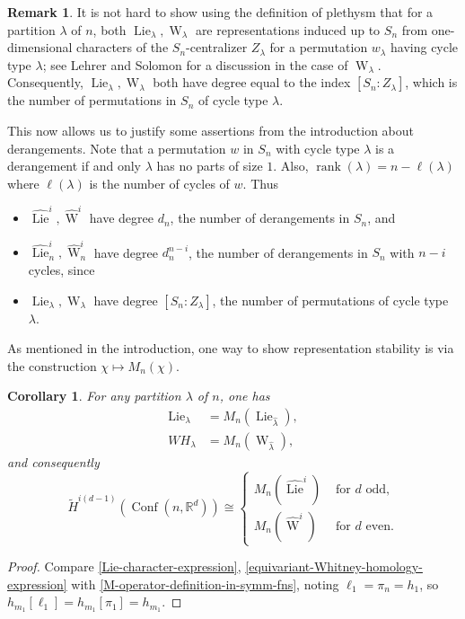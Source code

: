 \documentclass[12pt]{amsart}
\theoremstyle{plain}
\newtheorem{cor}[thm]{Corollary}
\theoremstyle{definition}
\newtheorem{remark}[thm]{Remark}
\begin{document}
\begin{remark}
\label{derangement-remark}
It is not hard to show using the definition of plethysm that
for a partition $\lambda$ of $n$, both 
${{\operatorname{Lie}}}_\lambda, {{\operatorname{W}}}_\lambda$ are representations induced up to $S_n$
from one-dimensional characters of the $S_n$-centralizer 
$Z_\lambda$ for a permutation $w_\lambda$ having cycle type $\lambda$;
see Lehrer and Solomon \cite{LehrerSolomon} for a discussion in the
case of ${{\operatorname{W}}}_\lambda$.  Consequently, ${{\operatorname{Lie}}}_\lambda, {{\operatorname{W}}}_\lambda$ both 
have degree equal to the index $[S_n:Z_\lambda]$,
which is the number of permutations in $S_n$ of cycle type $\lambda$.

This now allows us to justify some assertions from the introduction about
derangements.  Note that a permutation $w$ in $S_n$ with cycle type
$\lambda$ is a derangement if and only $\lambda$ has
no parts of size $1$.  Also,  
${{\operatorname{rank}}}(\lambda)=n-\ell(\lambda)$ where $\ell(\lambda)$ is the number of 
cycles of $w$.  Thus 
\begin{itemize} 
\item
$\widehat{{\operatorname{Lie}}}^i, \widehat{{\operatorname{W}}}^i$
have degree $d_n$, the number
of derangements in $S_n$, and
\item 
$\widehat{{\operatorname{Lie}}}^i_n, \widehat{{\operatorname{W}}}^i_n$ 
have degree $d_n^{n-i}$, the number of derangements in $S_n$
with $n-i$ cycles, since
\item 
${{\operatorname{Lie}}}_\lambda, {{\operatorname{W}}}_\lambda$
have degree $[S_n:Z_\lambda]$, the number of permutations of cycle type $\lambda$.
\end{itemize}
\end{remark}

As mentioned in the introduction, 
one way to show representation stability is via
the construction $\chi \mapsto M_n(\chi)$.
\begin{cor}
\label{M-expressions-of-cohomology}
For any partition $\lambda$ of $n$, one has 
$$
\begin{aligned}
{{\operatorname{Lie}}}_\lambda &=M_n\left( {{\operatorname{Lie}}}_{\widehat{\lambda}} \right),\\
WH_\lambda &= M_n\left( {{\operatorname{W}}}_{\widehat{\lambda}} \right),
\end{aligned}
$$
and consequently
$$
\tilde{H}^{i(d-1)}({{\operatorname{Conf}}}(n,{{\mathbb{R}}}^d))
\cong
\begin{cases}
M_n\left( \widehat{{\operatorname{Lie}}}^i \right)
  & \text{ for }d\text{ odd},\\
M_n\left( \widehat{{\operatorname{W}}}^i \right)
  & \text{ for }d\text{ even}.
\end{cases}
$$
\end{cor}
\begin{proof}
Compare \eqref{Lie-character-expression},  
\eqref{equivariant-Whitney-homology-expression} with \eqref{M-operator-definition-in-symm-fns}, 
noting $\ell_1 = \pi_n=h_1$, so 
$h_{m_1}[\ell_1]=h_{m_1}[\pi_1]=h_{m_1}$.
\end{proof}
\end{document}
